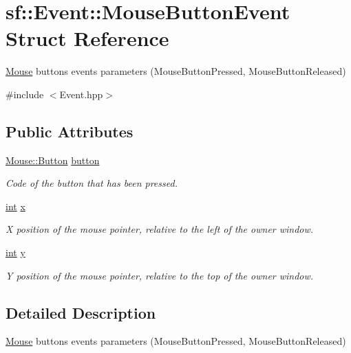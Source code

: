 \hypertarget{structsf_1_1_event_1_1_mouse_button_event}{\section{sf\-:\-:Event\-:\-:Mouse\-Button\-Event Struct Reference}
\label{structsf_1_1_event_1_1_mouse_button_event}
}


\hyperlink{classsf_1_1_mouse}{Mouse} buttons events parameters (Mouse\-Button\-Pressed, Mouse\-Button\-Released)  




{\ttfamily \#include $<$Event.\-hpp$>$}

\subsection*{Public Attributes}
\begin{DoxyCompactItemize}
\item 
\hyperlink{classsf_1_1_mouse_a4fb128be433f9aafe66bc0c605daaa90}{Mouse\-::\-Button} \hyperlink{structsf_1_1_event_1_1_mouse_button_event_a5f53725aa7b647705486eeb95f723024}{button}
\begin{DoxyCompactList}\small\item\em Code of the button that has been pressed. \end{DoxyCompactList}\item 
\hyperlink{term__entry_8h_ad65b480f8c8270356b45a9890f6499ae}{int} \hyperlink{structsf_1_1_event_1_1_mouse_button_event_a49b937b311729174950787781aafcdc7}{x}
\begin{DoxyCompactList}\small\item\em X position of the mouse pointer, relative to the left of the owner window. \end{DoxyCompactList}\item 
\hyperlink{term__entry_8h_ad65b480f8c8270356b45a9890f6499ae}{int} \hyperlink{structsf_1_1_event_1_1_mouse_button_event_aae4735071868d4411d1782bf67619d64}{y}
\begin{DoxyCompactList}\small\item\em Y position of the mouse pointer, relative to the top of the owner window. \end{DoxyCompactList}\end{DoxyCompactItemize}


\subsection{Detailed Description}
\hyperlink{classsf_1_1_mouse}{Mouse} buttons events parameters (Mouse\-Button\-Pressed, Mouse\-Button\-Released) 

